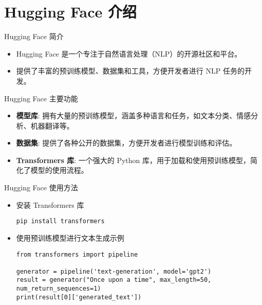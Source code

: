 \section{Hugging Face 介绍}
\begin{frame}{Hugging Face 简介}
    \begin{itemize}
        \item Hugging Face 是一个专注于自然语言处理（NLP）的开源社区和平台。
        \item 提供了丰富的预训练模型、数据集和工具，方便开发者进行 NLP 任务的开发。
    \end{itemize}
\end{frame}

\begin{frame}{Hugging Face 主要功能}
    \begin{itemize}
        \item \textbf{模型库}: 拥有大量的预训练模型，涵盖多种语言和任务，如文本分类、情感分析、机器翻译等。
        \item \textbf{数据集}: 提供了各种公开的数据集，方便开发者进行模型训练和评估。
        \item \textbf{Transformers 库}: 一个强大的 Python 库，用于加载和使用预训练模型，简化了模型的使用流程。
    \end{itemize}
\end{frame}

\begin{frame}{Hugging Face 使用方法}
    \begin{itemize}
        \item 安装 Transformers 库
        \begin{lstlisting}[style=pythonstyle]
pip install transformers
        \end{lstlisting}
        \item 使用预训练模型进行文本生成示例
        \begin{lstlisting}[style=pythonstyle]
from transformers import pipeline

generator = pipeline('text-generation', model='gpt2')
result = generator("Once upon a time", max_length=50, num_return_sequences=1)
print(result[0]['generated_text'])
        \end{lstlisting}
    \end{itemize}
\end{frame}

